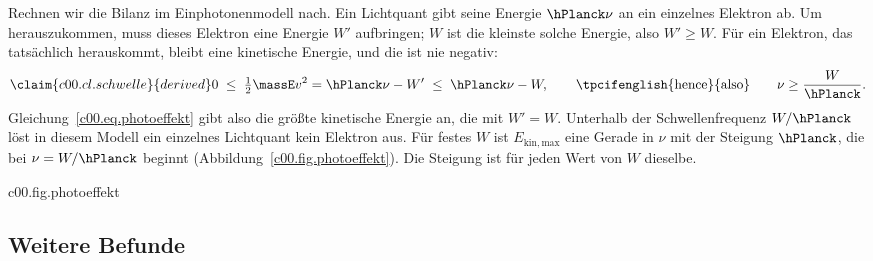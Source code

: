 Rechnen wir die Bilanz im Einphotonenmodell nach. Ein Lichtquant gibt seine Energie
$\hPlanck\nu$ an ein einzelnes Elektron ab. Um herauszukommen, muss dieses Elektron eine
Energie $W'$ aufbringen; $W$ ist die kleinste solche Energie, also $W' \geq W$. Für ein
Elektron, das tatsächlich herauskommt, bleibt eine kinetische Energie, und die ist nie
negativ:
\begin{equation}\label{c00.eq.schwelle}\claim{c00.cl.schwelle}{derived}
  0 \;\leq\; \tfrac12 \massE v^2 = \hPlanck\nu - W' \;\leq\; \hPlanck\nu - W,
  \qquad \text{\tpcifenglish{hence}{also}} \qquad
  \nu \geq \frac{W}{\hPlanck} .
\end{equation}
Gleichung~\eqref{c00.eq.photoeffekt} gibt also die größte kinetische Energie an, die mit
$W' = W$. Unterhalb der Schwellenfrequenz $W/\hPlanck$ löst in diesem Modell ein einzelnes
Lichtquant kein Elektron aus. Für festes $W$ ist $E_{\mathrm{kin,max}}$ eine Gerade in $\nu$
mit der Steigung $\hPlanck$, die bei
$\nu = W/\hPlanck$ beginnt (Abbildung~\ref{c00.fig.photoeffekt}). Die Steigung ist für jeden
Wert von $W$ dieselbe.

\begin{tpcfigure}{c00.fig.photoeffekt}
  \caption{Die maximale kinetische Energie~\eqref{c00.eq.photoeffekt} der Photoelektronen,
    aufgetragen für zwei feste Werte der Bindungsenergie, $W_1$ (durchgezogen) und
    $W_2 = \tfrac85 W_1$ (gestrichelt; das Verhältnis ist für das Bild gewählt). Beide
    Geraden haben dieselbe Steigung $\hPlanck$: Zu einem Frequenzunterschied $\nu' - \nu$
    gehört der Energieunterschied $\hPlanck(\nu' - \nu)$. Jede Gerade beginnt bei ihrer
    Schwelle $\nu = W/\hPlanck$ aus Gleichung~\eqref{c00.eq.schwelle}. Die gepunkteten
    Verlängerungen treffen die Achse bei $-W$; dort wäre die kinetische Energie negativ.}
\end{tpcfigure}

\subsection{Weitere Befunde}\label{c00.s4.3}

